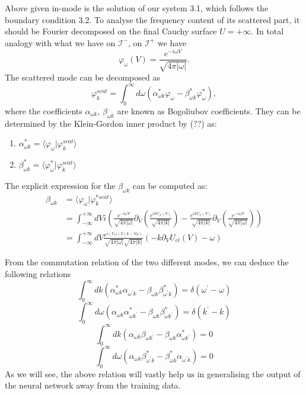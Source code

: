 Above given in-mode is the solution of our system 3.1, which follows the boundary condition 3.2. To analyse the frequency content of its scattered part, it should be Fourier decomposed on the final Cauchy surface $U=+\infty$. In total analogy with what we have on $\mathcal{I}^{-}$, on $\mathcal{I}^{+}$ we have 
\begin{equation}
\varphi_{\omega}(V)=\frac{e^{-i\omega V}}{\sqrt{4\pi|\omega|}}.
\end{equation}
The scattered mode can be decomposed as 
\begin{equation}
\varphi_{k}^{scat}=\int_{0}^{\infty}d\omega(\alpha_{\omega k}^{*}\varphi_{\omega}-\beta_{\omega k}^{*}\varphi_{\omega}^{*}),
\end{equation}
where the coefficients $\alpha_{\omega k}$, $\beta_{\omega k}$ are known as Bogoliubov coefficients. They can be determined by the Klein-Gordon inner product by (??) as: 
\begin{enumerate}
    \item $\alpha_{\omega k}^{*}=\langle\varphi_{\omega}|\varphi_{k}^{scat}\rangle$ 
    \item $\beta_{\omega k}^{*}=\langle\varphi_{\omega}^{*}|\varphi_{k}^{scat}\rangle$ 
\end{enumerate}

The explicit expression for the $\beta_{\omega k}$ can be computed as: 
\begin{align*}
\beta_{\omega k} &= \langle\varphi_{\omega}|\varphi_{k}^{*scat}\rangle \\
&= \int_{-\infty}^{+\infty}dVi\left(\frac{e^{-i\omega V}}{\sqrt{4\pi|\omega|}}\partial_{V}\left(\frac{e^{ikU_{cl}(V)}}{\sqrt{4\pi|k|}}\right)-\frac{e^{ikU_{cl}(V)}}{\sqrt{4\pi|k|}}\partial_{V}\left(\frac{e^{-i\omega V}}{\sqrt{4\pi|\omega|}}\right)\right) \\
&= \int_{-\infty}^{+\infty}dV\frac{e^{i(U_{cl}(V)k-V\omega)}}{\sqrt{4\pi|\omega|}\sqrt{4\pi|k|}}(-k\partial_{V}U_{cl}(V)-\omega)
\end{align*}

From the commutation relation of the two different modes, we can deduce the following relations 
\begin{equation}
\int_{0}^{\infty}dk(\alpha_{\omega k}^{*}\alpha_{\omega^{\prime}k}-\beta_{\omega k}\beta_{\omega^{\prime}k}^{*})=\delta(\omega^{\prime}-\omega)
\end{equation}
\begin{equation}
\int_{0}^{\infty}d\omega(\alpha_{\omega k}\alpha_{\omega k^{\prime}}^{*}-\beta_{\omega k}\beta_{\omega k^{\prime}}^{*})=\delta(k^{\prime}-k)
\end{equation}
\begin{equation}
\int_{0}^{\infty}dk(\alpha_{\omega k}\beta_{\omega k^{\prime}}-\beta_{\omega k}\alpha_{\omega k^{\prime}}^{*})=0
\end{equation}
\begin{equation}
\int_{0}^{\infty}d\omega(\alpha_{\omega k}\beta_{\omega^{\prime}k}^{*}-\beta_{\omega k}^{*}\alpha_{\omega^{\prime}k})=0
\end{equation}
As we will see, the above relation will vastly help us in generalising the output of the neural network away from the training data.

